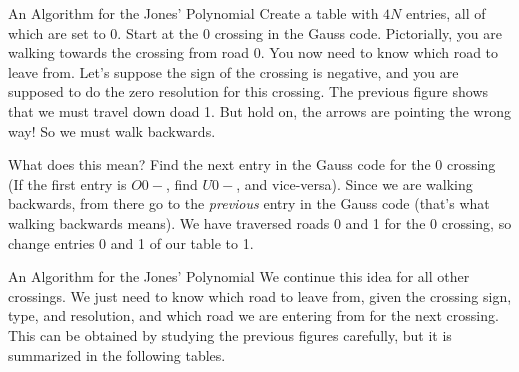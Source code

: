 \documentclass{beamer}
\begin{document}
    \begin{frame}{An Algorithm for the Jones' Polynomial}
        Create a table with $4N$ entries, all of which are set to 0.
        Start at the 0 crossing in the Gauss code. Pictorially, you are walking
        towards the crossing from road 0. You now need to know which road to
        leave from. Let's suppose the sign of the crossing is negative, and
        you are supposed to do the zero resolution for this crossing. The
        previous figure shows that we must travel down doad 1. But hold on,
        the arrows are pointing the wrong way! So we must walk backwards.
        \par\hfill\par
        What does this mean? Find the next entry in the Gauss code for the 0
        crossing (If the first entry is $O0-$, find $U0-$, and vice-versa).
        Since we are walking backwards, from there go to the \textit{previous}
        entry in the Gauss code (that's what walking backwards means). We have
        traversed roads 0 and 1 for the 0 crossing, so change entries 0 and 1 of
        our table to 1.
    \end{frame}
    \begin{frame}{An Algorithm for the Jones' Polynomial}
        We continue this idea for all other crossings. We just need to know
        which road to leave from, given the crossing sign, type, and resolution,
        and which road we are entering from for the next crossing. This can be
        obtained by studying the previous figures carefully, but it is
        summarized in the following tables.
    \end{frame}
\end{document}
